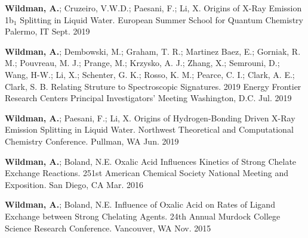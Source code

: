 


\begin{cvpresentations}


\cvpresentation
{\textbf{Wildman, A.}; Cruzeiro, V.W.D.; Paesani, F.; Li, X. Origins of X-Ray Emission 1b$_1$ Splitting in Liquid Water. European Summer School for Quantum Chemistry} %
{Palermo, IT} %
{Sept. 2019} %


\cvpresentation
{\textbf{Wildman, A.}; Dembowski, M.; Graham, T. R.; Martinez Baez, E.; Gorniak, R. M.; Pouvreau, M. J.; Prange, M.; Krzysko, A. J.; Zhang, X.; Semrouni, D.; Wang, H-W.; Li, X.; Schenter, G. K.; Rosso, K. M.; Pearce, C. I.; Clark, A. E.; Clark, S. B. Relating Struture to Spectroscopic Signatures. 2019 Energy Frontier Research Centers Principal Investigators' Meeting}
{Washington, D.C.} %
{Jul. 2019} %


\cvpresentation
{\textbf{Wildman, A.}; Paesani, F.; Li, X. Origins of Hydrogen-Bonding Driven X-Ray Emission Splitting in Liquid Water. Northwest Theoretical and Computational Chemistry Conference.} %
{Pullman, WA} %
{Jun. 2019} %


\cvpresentation
{\textbf{Wildman, A.}; Boland, N.E. Oxalic Acid Influences Kinetics of Strong Chelate Exchange Reactions. 251st American Chemical Society National Meeting and Exposition.} %
{San Diego, CA} %
{Mar. 2016} %


\cvpresentation
{\textbf{Wildman, A.}; Boland, N.E. Influence of Oxalic Acid on Rates of Ligand Exchange between Strong Chelating Agents. 24th Annual Murdock College Science Research Conference.} %
{Vancouver, WA} %
{Nov. 2015} %


\end{cvpresentations}
\vspace{-1cm}
